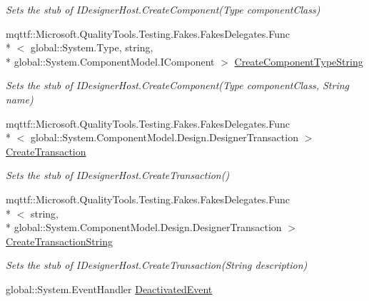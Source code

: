 \begin{DoxyCompactItemize}
\begin{DoxyCompactList}\small\item\em Sets the stub of I\-Designer\-Host.\-Create\-Component(\-Type component\-Class)\end{DoxyCompactList}\item 
mqttf\-::\-Microsoft.\-Quality\-Tools.\-Testing.\-Fakes.\-Fakes\-Delegates.\-Func\\*
$<$ global\-::\-System.\-Type, string, \\*
global\-::\-System.\-Component\-Model.\-I\-Component $>$ \hyperlink{class_system_1_1_component_model_1_1_design_1_1_serialization_1_1_fakes_1_1_stub_i_designer_loader_host_a53f49ea17233e31caac5e47d885692a5}{Create\-Component\-Type\-String}
\begin{DoxyCompactList}\small\item\em Sets the stub of I\-Designer\-Host.\-Create\-Component(\-Type component\-Class, String name)\end{DoxyCompactList}\item 
mqttf\-::\-Microsoft.\-Quality\-Tools.\-Testing.\-Fakes.\-Fakes\-Delegates.\-Func\\*
$<$ global\-::\-System.\-Component\-Model.\-Design.\-Designer\-Transaction $>$ \hyperlink{class_system_1_1_component_model_1_1_design_1_1_serialization_1_1_fakes_1_1_stub_i_designer_loader_host_a5ae712b1cd75abaf68b99e85c2467030}{Create\-Transaction}
\begin{DoxyCompactList}\small\item\em Sets the stub of I\-Designer\-Host.\-Create\-Transaction()\end{DoxyCompactList}\item 
mqttf\-::\-Microsoft.\-Quality\-Tools.\-Testing.\-Fakes.\-Fakes\-Delegates.\-Func\\*
$<$ string, \\*
global\-::\-System.\-Component\-Model.\-Design.\-Designer\-Transaction $>$ \hyperlink{class_system_1_1_component_model_1_1_design_1_1_serialization_1_1_fakes_1_1_stub_i_designer_loader_host_ad4befea607f6994867060eb6448239e5}{Create\-Transaction\-String}
\begin{DoxyCompactList}\small\item\em Sets the stub of I\-Designer\-Host.\-Create\-Transaction(\-String description)\end{DoxyCompactList}\item 
global\-::\-System.\-Event\-Handler \hyperlink{class_system_1_1_component_model_1_1_design_1_1_serialization_1_1_fakes_1_1_stub_i_designer_loader_host_ac6aea876dfbc576f036c0c14b99491f7}{Deactivated\-Event}

\end{DoxyCompactItemize}
